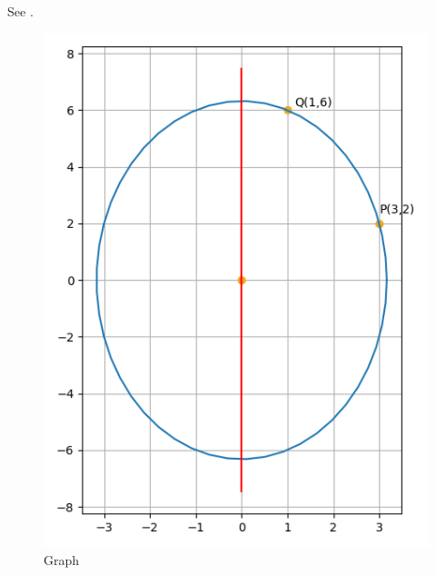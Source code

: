 See  
.
\begin{figure}[ht]
\centering
\includegraphics[width = \columnwidth]{chapters/11/11/3/19/figs/fig1.png}
\caption{Graph}
\label{fig:chapters/11/11/3/19/1}
\end{figure}
